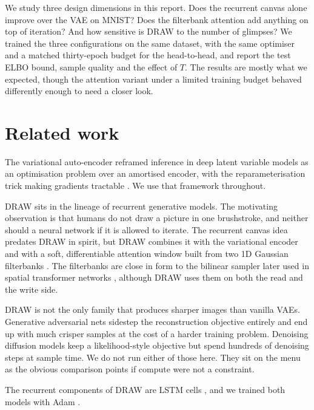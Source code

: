 \documentclass{article}
\begin{document}
We study three design dimensions in this report. Does the recurrent
canvas alone improve over the VAE on MNIST? Does the filterbank attention add
anything on top of iteration? And how sensitive is DRAW to the number of
glimpses? We trained the three configurations on the same dataset, with the
same optimiser and a matched thirty-epoch budget for the head-to-head, and
report the test ELBO bound, sample quality and the effect of \(T\). The
results are mostly what we expected, though the attention variant under a
limited training budget behaved differently enough to need a closer look.

\section{Related work}
\label{sec:related}

The variational auto-encoder reframed inference in deep latent variable models
as an optimisation problem over an amortised encoder, with the
reparameterisation trick making gradients tractable
\citep{kingma2014vae,rezende2014stochastic}. We use that framework throughout.

DRAW sits in the lineage of recurrent generative models. The motivating
observation is that humans do not draw a picture in one brushstroke, and
neither should a neural network if it is allowed to iterate. The recurrent
canvas idea predates DRAW in spirit, but DRAW combines it with the variational
encoder and with a soft, differentiable attention window built from two 1D
Gaussian filterbanks \citep{gregor2015draw}. The filterbanks are close in form
to the bilinear sampler later used in spatial transformer networks
\citep{jaderberg2015spatial}, although DRAW uses them on both the read and
the write side.

DRAW is not the only family that produces sharper images than vanilla VAEs.
Generative adversarial nets \citep{goodfellow2014gan} sidestep the
reconstruction objective entirely and end up with much crisper samples at the
cost of a harder training problem. Denoising diffusion models
\citep{ho2020ddpm} keep a likelihood-style objective but spend hundreds of
denoising steps at sample time. We do not run either of those here. They sit
on the menu as the obvious comparison points if compute were not a constraint.

The recurrent components of DRAW are LSTM cells \citep{hochreiter1997lstm},
and we trained both models with Adam \citep{kingma2015adam}.
\end{document}
